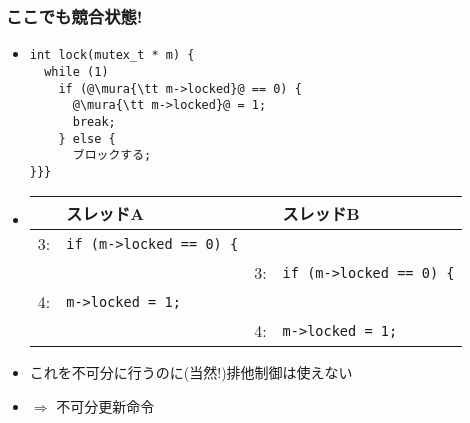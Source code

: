 \documentclass[12pt,dvipdfmx]{beamer}
\begin{document}
\begin{frame}[fragile]
  \frametitle{ここでも競合状態!}
  \begin{itemize}
  \item []
\begin{lstlisting}
int lock(mutex_t * m) {
  while (1)   
    if (@\mura{\tt m->locked}@ == 0) {
      @\mura{\tt m->locked}@ = 1;
      break;
    } else {
      ブロックする;
}}}
\end{lstlisting}
\item []
  \begin{center}
    {\footnotesize
\begin{tabular}{|ll|ll|}
   & スレッドA                       &    & スレッドB                      \\\hline
3: & {\tt if (m->locked == 0) \{}    &    &                                \\
   &                                 & 3: & {\tt if (m->locked == 0) \{}   \\
4: & {\tt m->locked = 1;}            &    &                                \\
   &                                 & 4: & {\tt m->locked = 1;}           \\
\end{tabular}}
\end{center}

\item これを不可分に行うのに(当然!)排他制御は使えない
\item $\Rightarrow$ 不可分更新命令
\end{itemize}
\end{frame}
\end{document}
